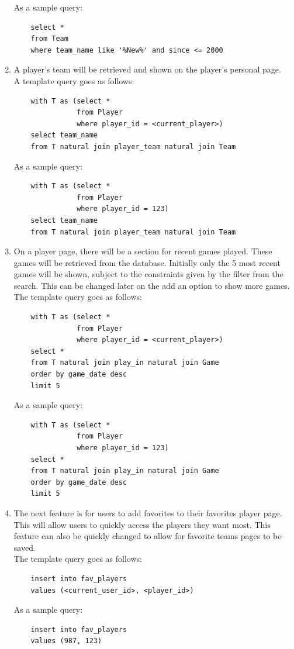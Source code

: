 \documentclass[11pt]{article}
\begin{document}
\begin{enumerate}
As a sample query:
\begin{verbatim}
    select *
    from Team
    where team_name like '%New%' and since <= 2000
\end{verbatim}

\item A player's team will be retrieved and shown on the player's personal page.\\ 

A template query goes as follows:
\begin{verbatim}
    with T as (select *
               from Player
               where player_id = <current_player>)
    select team_name
    from T natural join player_team natural join Team
\end{verbatim}

As a sample query:
\begin{verbatim}
    with T as (select *
               from Player
               where player_id = 123)
    select team_name
    from T natural join player_team natural join Team
\end{verbatim}

\item On a player page, there will be a section for recent games played. These games will be retrieved from the database. Initially only the 5 most recent games will be shown, subject to the constraints given by the filter from the search. This can be changed later on the add an option to show more games. \\

The template query goes as follows:

\begin{verbatim}
    with T as (select *
               from Player
               where player_id = <current_player>)
    select *
    from T natural join play_in natural join Game
    order by game_date desc
    limit 5
\end{verbatim}

As a sample query:

\begin{verbatim}
    with T as (select *
               from Player
               where player_id = 123)
    select *
    from T natural join play_in natural join Game
    order by game_date desc
    limit 5
\end{verbatim}

\item The next feature is for users to add favorites to their favorites player page. This will allow users to quickly access the players they want most. This feature can also be quickly changed to allow for favorite teams pages to be saved. \\
The template query goes as follows:
\begin{verbatim}
    insert into fav_players
    values (<current_user_id>, <player_id>)
\end{verbatim}

As a sample query:
\begin{verbatim}
    insert into fav_players
    values (987, 123)
\end{verbatim}
\end{enumerate}
\end{document}
